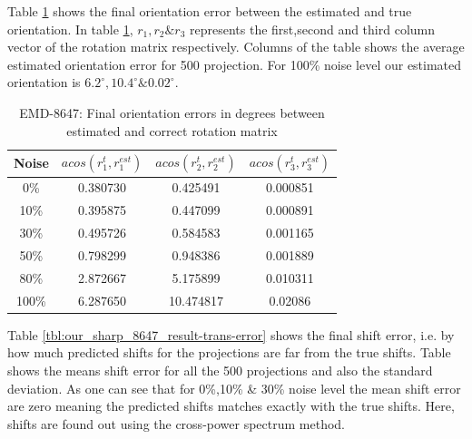 \documentclass{report}
\begin{document}
Table \ref{tbl:our_sharp_8647_result-acos-rot} shows the final orientation error between the estimated and true orientation. In table \ref{tbl:our_sharp_8647_result-acos-rot}, $r_1,r_2 \& r_3$ represents the first,second and third column vector of the rotation matrix respectively. Columns of the table shows the average estimated orientation error for 500 projection. For 100\% noise level our estimated orientation is $6.2^\circ,10.4^\circ \& 0.02^\circ$. 

\begin{table}[H]
    \centering
     \begin{tabular}{||c c c c||} 
             \hline
             Noise 
             & $acos(r_1^{t},r_1^{est})$ 
             & $acos(r_2^{t},r_2^{est})$
             & $acos(r_3^{t},r_3^{est})$ 
             \\ 
            \hline\hline
            0\%   &0.380730&0.425491&0.000851 \\\hline
            10\%  &0.395875&0.447099&0.000891 \\\hline
            30\%  &0.495726&0.584583&0.001165 \\\hline
            50\%  &0.798299&0.948386&0.001889 \\\hline
            80\%  &2.872667&5.175899&0.010311 \\\hline
            100\% &6.287650&10.474817&0.02086 \\\hline
            \hline
    \end{tabular}
    \captionsetup{justification=centering}
    \caption{EMD-8647: Final orientation errors in degrees between estimated and correct rotation matrix}
    \label{tbl:our_sharp_8647_result-acos-rot}
\end{table}

Table \ref{tbl:our_sharp_8647_result-trans-error} shows the final shift error, i.e. by how much predicted shifts for the projections are far from the true shifts. Table shows the means shift error for all the 500 projections and also the standard deviation. As one can see that for 0\%,10\% \& 30\% noise level the mean shift error are zero meaning the predicted shifts matches exactly with the true shifts. Here, shifts are found out using the cross-power spectrum method. 
\end{document}
